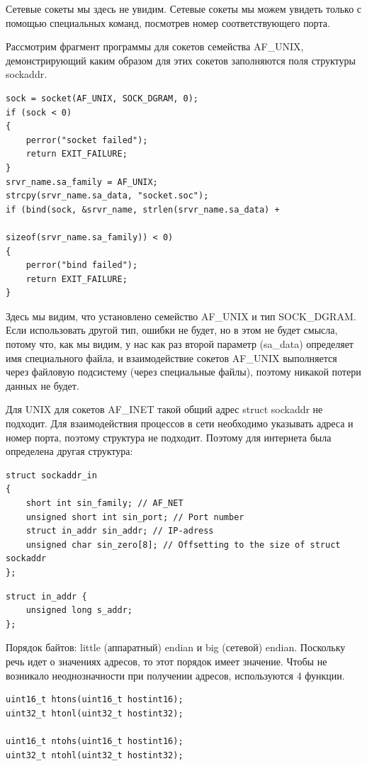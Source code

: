 \documentclass[12pt,a4paper]{scrreprt}
\begin{document}
Сетевые сокеты мы здесь не увидим. Сетевые сокеты мы можем увидеть только с помощью специальных команд, посмотрев номер соответствующего порта.

Рассмотрим фрагмент программы для сокетов семейства AF\_UNIX, демонстрирующий каким образом для этих сокетов заполняются поля структуры sockaddr.

\begin{lstlisting}
sock = socket(AF_UNIX, SOCK_DGRAM, 0);
if (sock < 0) 
{
	perror("socket failed");
	return EXIT_FAILURE;
}
srvr_name.sa_family = AF_UNIX;
strcpy(srvr_name.sa_data, "socket.soc");
if (bind(sock, &srvr_name, strlen(srvr_name.sa_data) + 
													sizeof(srvr_name.sa_family)) < 0) 
{
	perror("bind failed");
	return EXIT_FAILURE;
}
\end{lstlisting}

Здесь мы видим, что установлено семейство AF\_UNIX и тип SOCK\_DGRAM. Если использовать другой тип, ошибки не будет, но в этом не будет смысла, потому что, как мы видим, у нас как раз второй параметр (sa\_data) определяет имя специального файла, и взаимодействие сокетов AF\_UNIX выполняется через файловую подсистему (через специальные файлы), поэтому никакой потери данных не будет.

Для UNIX для сокетов AF\_INET такой общий адрес struct sockaddr не подходит. Для взаимодействия процессов в сети необходимо указывать адреса и номер порта, поэтому структура не подходит. Поэтому для интернета была определена другая структура:

\begin{lstlisting}
struct sockaddr_in
{ 
	short int sin_family; // AF_NET
	unsigned short int sin_port; // Port number
	struct in_addr sin_addr; // IP-adress
	unsigned char sin_zero[8]; // Offsetting to the size of struct sockaddr
};
\end{lstlisting}

\begin{lstlisting}
struct in_addr {
	unsigned long s_addr;
};
\end{lstlisting}

Порядок байтов: little (аппаратный) endian и big (сетевой) endian. Поскольку речь идет о значениях адресов, то этот порядок имеет значение. Чтобы не возникало неоднозначности при получении адресов, используются 4 функции. 

\begin{lstlisting}
uint16_t htons(uint16_t hostint16);
uint32_t htonl(uint32_t hostint32);

uint16_t ntohs(uint16_t hostint16);
uint32_t ntohl(uint32_t hostint32);
\end{lstlisting}
\end{document}
